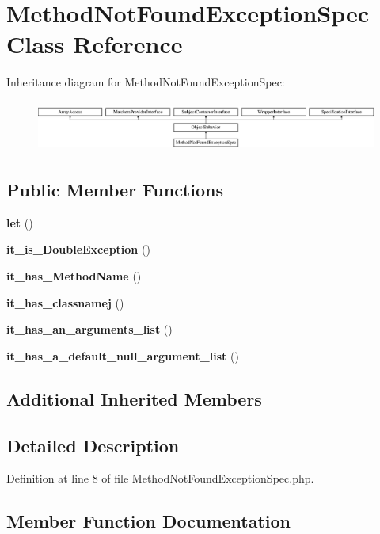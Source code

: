 \section{Method\+Not\+Found\+Exception\+Spec Class Reference}
\label{classspec_1_1_prophecy_1_1_exception_1_1_doubler_1_1_method_not_found_exception_spec}
Inheritance diagram for Method\+Not\+Found\+Exception\+Spec\+:\begin{figure}[H]
\begin{center}
\leavevmode
\includegraphics[height=1.671642cm]{classspec_1_1_prophecy_1_1_exception_1_1_doubler_1_1_method_not_found_exception_spec}
\end{center}
\end{figure}
\subsection*{Public Member Functions}
\begin{DoxyCompactItemize}
\item 
{\bf let} ()
\item 
{\bf it\+\_\+is\+\_\+\+Double\+Exception} ()
\item 
{\bf it\+\_\+has\+\_\+\+Method\+Name} ()
\item 
{\bf it\+\_\+has\+\_\+classnamej} ()
\item 
{\bf it\+\_\+has\+\_\+an\+\_\+arguments\+\_\+list} ()
\item 
{\bf it\+\_\+has\+\_\+a\+\_\+default\+\_\+null\+\_\+argument\+\_\+list} ()
\end{DoxyCompactItemize}
\subsection*{Additional Inherited Members}


\subsection{Detailed Description}


Definition at line 8 of file Method\+Not\+Found\+Exception\+Spec.\+php.



\subsection{Member Function Documentation}
